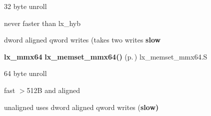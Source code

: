 \begin{CompactItemize}
\begin{CompactItemize}
\item 
32 byte unroll\item 
never faster than lx\_\-hyb \item 
dword aligned qword writes (takes two writes {\bf slow}\end{CompactItemize}
\item 
{\bf lx\_\-mmx64} {\bf lx\_\-memset\_\-mmx64()} {\rm (p.\,\pageref{memset_2def__test_8h_a10})} lx\_\-memset\_\-mmx64.S\begin{CompactItemize}
\item 
64 byte unroll\item 
fast $>$512B and aligned\item 
unaligned uses dword aligned qword writes ({\bf slow)} \end{CompactItemize}
\end{CompactItemize}
